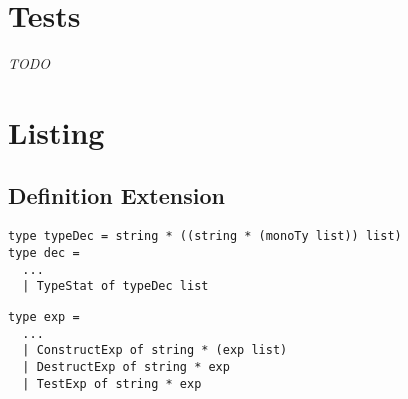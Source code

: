 \documentclass[a4paper,12pt]{article}
\begin{document}
\section{Tests}
	\textit{TODO}

\section{Listing}
	\subsection{Definition Extension}
		\begin{lstlisting}
type typeDec = string * ((string * (monoTy list)) list)
type dec =
  ...
  | TypeStat of typeDec list
		\end{lstlisting}
	
		\begin{lstlisting}
type exp =
  ...
  | ConstructExp of string * (exp list)
  | DestructExp of string * exp
  | TestExp of string * exp
		\end{lstlisting}
\end{document}

